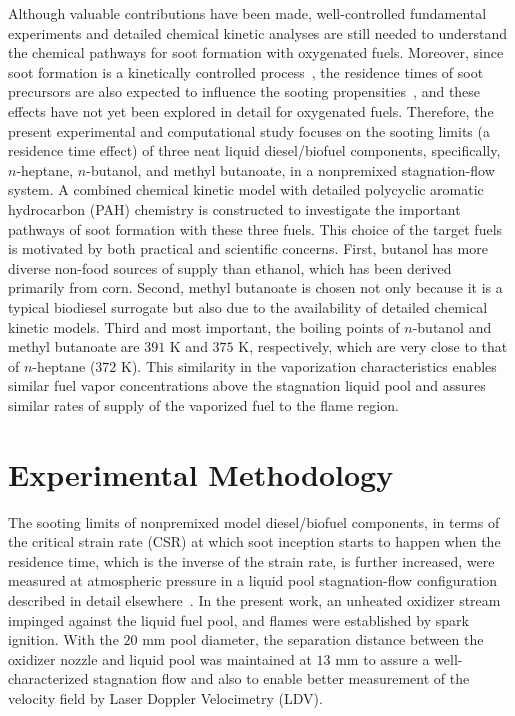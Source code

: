 \documentclass[review,3p,times]{elsarticleUS}
\begin{document}
Although valuable contributions have been made, well-controlled fundamental experiments and detailed chemical kinetic analyses are still needed to understand the chemical pathways for soot formation with oxygenated fuels. Moreover, since soot formation is a kinetically controlled process~\cite{vandsburger85}, the residence times of soot precursors are also expected to influence the sooting propensities~\cite{tsuji71}, and these effects have not yet been explored in detail for oxygenated fuels. Therefore, the present experimental and computational study focuses on the sooting limits (a residence time effect) of three neat liquid diesel/biofuel components, specifically, $n$-heptane, $n$-butanol, and methyl butanoate, in a nonpremixed stagnation-flow system. A combined chemical kinetic model with detailed polycyclic aromatic hydrocarbon (PAH) chemistry is constructed to investigate the important pathways of soot formation with these three fuels. This choice of the target fuels is motivated by both practical and 
scientific concerns. First, butanol has more diverse non-food sources of supply 
than ethanol, which has been derived primarily from corn. Second, methyl butanoate is chosen not only because it is a typical biodiesel surrogate but also due to the availability of detailed chemical kinetic models. Third and most important, the boiling points of $n$-butanol and methyl butanoate are $391$ K and $375$ K, respectively, which are very close to that of $n$-heptane ($372$ K). This similarity in the vaporization characteristics enables similar fuel vapor concentrations above the stagnation liquid pool and assures similar rates of supply of the vaporized fuel to the flame region.


\section{Experimental Methodology}

The sooting limits of nonpremixed model diesel/biofuel components, in terms of the critical strain rate (CSR) at which soot inception starts to happen when the residence time, which is the inverse of the strain rate, is further increased, were measured at atmospheric pressure in a liquid pool stagnation-flow configuration described in detail elsewhere~\cite{liu10}. In the present work, an unheated oxidizer stream impinged against the liquid fuel pool, and flames were established by spark ignition. With the $20$ mm pool diameter, the separation distance between the oxidizer nozzle and liquid pool was maintained at $13$ mm to assure a well-characterized stagnation flow and also to enable better measurement of the velocity field by Laser Doppler Velocimetry (LDV).
\end{document}
